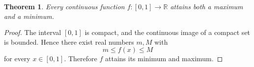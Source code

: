 \documentclass{article}
\newtheorem{theorem}{Theorem}
\begin{document}
\begin{theorem}\label{thm:extreme-value-gap}
Every continuous function $f:[0,1]\to\mathbb R$ attains both a maximum and
a minimum.
\end{theorem}
\begin{proof}
The interval $[0,1]$ is compact, and the continuous image of a compact set
is bounded. Hence there exist real numbers $m,M$ with
\[
  m\le f(x)\le M
\]
for every $x\in[0,1]$. Therefore $f$ attains its minimum and maximum.
\end{proof}
\end{document}

